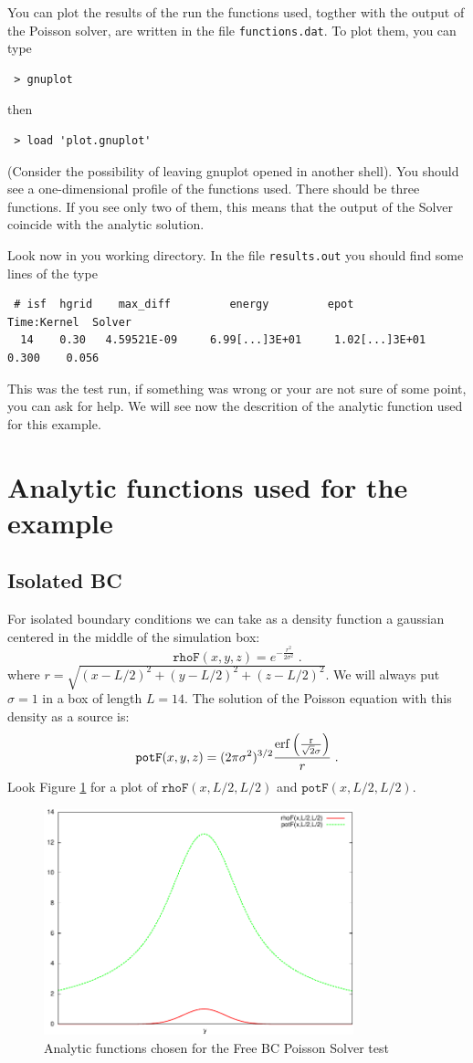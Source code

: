 \documentclass[a4paper]{article}
\newcommand{\be}{\begin{equation}}
\newcommand{\ee}{\end{equation}}
\begin{document}
You can plot the results of the run the functions used, togther with the output of the Poisson solver, are written in the file \texttt{functions.dat}. To plot them, you can type
\begin{verbatim}
 > gnuplot
\end{verbatim}
then
\begin{verbatim}
 > load 'plot.gnuplot'
\end{verbatim}
(Consider the possibility of leaving gnuplot opened in another shell). You should see a one-dimensional profile of the functions used. There should be three functions. If you see only two of them, this means that the output of the Solver coincide with the analytic solution.

Look now in you working directory. In the file \texttt{results.out} you should find some lines of the type
\begin{verbatim}
 # isf  hgrid    max_diff         energy         epot           Time:Kernel  Solver
  14    0.30   4.59521E-09     6.99[...]3E+01     1.02[...]3E+01    0.300    0.056 
\end{verbatim}
This was the test run, if something was wrong or your are not sure of some point, you can ask for help.
We will see now the descrition of the analytic function used for this example.

\newpage
\section*{Analytic functions used for the example}
\subsection*{Isolated BC}
For isolated boundary conditions we can take as a density function a gaussian centered in the middle of the simulation box:
\be
\texttt{rhoF}(x,y,z)=e^{-\frac{r^2}{2 \sigma^2}}\;.
\ee
where $r=\sqrt{(x-L/2)^2 + (y-L/2)^2 + (z-L/2)^2}$. We will always put $\sigma=1$ in a box of length $L=14$. 
The solution of the Poisson equation with this density as a source is:
\be
\texttt{potF}(x,y,z)=(2 \pi \sigma^2)^{3/2} \frac{\rm{erf}\left(\frac{r}{\sqrt{2} \sigma} \right)}{r}\;.
\ee
Look Figure \ref{fig1} for a plot of $\texttt{rhoF}(x,L/2,L/2)$ and $\texttt{potF}(x,L/2,L/2)$.
\begin{figure}[htbp]
 \centering \includegraphics[width=0.8\textwidth]{rhoFpotF.pdf}
\caption{Analytic functions chosen for the Free BC Poisson Solver test}\label{fig1}
\end{figure}
\end{document}
